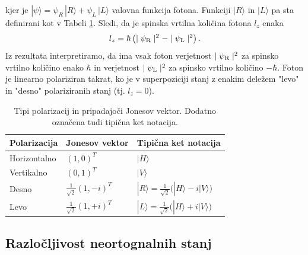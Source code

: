 \documentclass[12pt]{article}
\begin{document}
kjer je $| \psi \rangle = \psi_R \, | R \rangle + \psi_L \, |L \rangle$ valovna funkcija fotona. Funkciji $| R \rangle$ in $| L \rangle$ pa sta definirani kot v Tabeli \ref{tab:pol}.  Sledi, da je spinska vrtilna količina fotona $l_{z}$ enaka 
\begin{equation}
{\displaystyle l_{z}=\hbar \left(\mid \psi _{\rm {R}}\mid ^{2}-\mid \psi _{\rm {L}}\mid ^{2}\right).}
\end{equation}
Iz rezultata interpretiramo, da ima vsak foton verjetnost $\mid \psi _{\rm {R}}\mid ^{2}$ za spinsko vrtilno količino enako $\hbar$ in verjetnost $\mid \psi _{\rm {L}}\mid ^{2}$ za spinsko vrtilno količino $- \hbar$. Foton je linearno polariziran takrat, ko je v superpoziciji stanj z enakim deležem "levo" in "desno" polariziranih stanj (tj. $ l_z = 0$). \cite{PhotonPolarization2022}

\begin{table}[]
\centering
\renewcommand{\arraystretch}{1.5} %
\begin{tabular}{|l|l|l|}

\hline
\textbf{Polarizacija} & \textbf{Jonesov vektor}                                       & \textbf{Tipična ket notacija}                                                               \\ \hline
Horizontalno          & $ (1,0)^T $                          & $ |H\rangle $                                                                               \\ \hline
Vertikalno            & $(0,1)^T$                          & $ |V\rangle $                                                                               \\ \hline
Desno                 & ${\frac  {1}{{\sqrt  2}}}{(1, -i)^T}$ & $ { |R\rangle ={\frac {1}{\sqrt {2}}}{\big (}|H\rangle -i|V\rangle {\big )}} $ \\ \hline
Levo                  & $ {\frac  {1}{{\sqrt  2}}}{(1, +i)^T} $ & $ { |L\rangle ={\frac {1}{\sqrt {2}}}{\big (}|H\rangle +i|V\rangle {\big )}} $ \\ \hline
\end{tabular}
\caption{Tipi polarizacij in pripadajoči Jonesov vektor. Dodatno označena tudi tipična ket notacija. \cite{JonesCalculus2023} }
\label{tab:pol}
\end{table}

\subsection{Razločljivost neortognalnih stanj}
\end{document}
